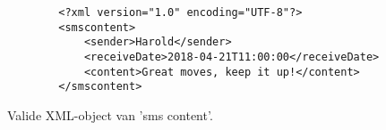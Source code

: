 \begin{figure}[htb]
    \centering
    \lstset{language=XML}
    \begin{lstlisting}
        <?xml version="1.0" encoding="UTF-8"?>
        <smscontent>
            <sender>Harold</sender>
            <receiveDate>2018-04-21T11:00:00</receiveDate>
            <content>Great moves, keep it up!</content>
        </smscontent>              
    \end{lstlisting}
    \caption{Valide XML-object van 'sms content'.}
    \label{fig:xmlsmscontent}
\end{figure}